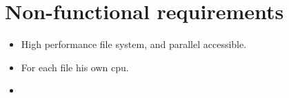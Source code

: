 {
\setcounter{funcNFR}{10}
\renewcommand{\labelitemi}{
	\ifnum \value{funcNFR}<10$/NF 0\arabic{funcNFR} /$\addtocounter{funcNFR}{10}
	\else $/NF \arabic{funcNFR} /$\addtocounter{funcNFR}{10}\fi
}

\section{Non-functional requirements}
	\begin{itemize}
		\item High performance file system, and parallel accessible.
		\item For each file his own cpu.
		\item 
	\end{itemize}
}